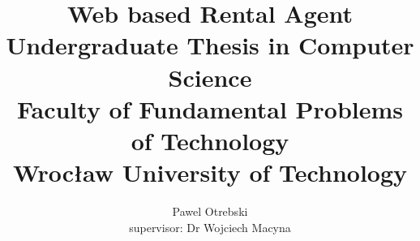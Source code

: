 \documentclass[10pt,a4paper]{report}
\begin{document}
\begin{titlepage}
\author{Pawel Otrebski \\
	\small{supervisor: Dr Wojciech Macyna}
 }
\title{Web based Rental Agent\\
	\small{
	Undergraduate Thesis in Computer Science\\
	Faculty of Fundamental Problems of Technology\\
	Wrocław University of Technology}}
\date{}
\end{titlepage}
\maketitle


\end{document}
